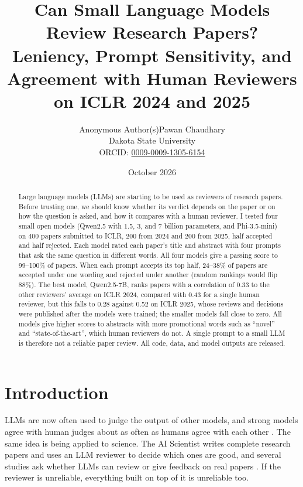 \documentclass[11pt]{article}
\title{\textbf{Can Small Language Models Review Research Papers?}\\[0.3em]
\large Leniency, Prompt Sensitivity, and Agreement with Human Reviewers on ICLR 2024 and 2025}
\author{\ifanonymous Anonymous Author(s)\else Pawan Chaudhary\\ \small Dakota State University\\ \small ORCID: \href{https://orcid.org/0009-0009-1305-6154}{0009-0009-1305-6154}\fi}
\date{October 2026}
\begin{document}
\maketitle

\begin{abstract}
\noindent
Large language models (LLMs) are starting to be used as reviewers of research papers. Before trusting one, we should know whether its verdict depends on the paper or on how the question is asked, and how it compares with a human reviewer. I tested four small open models (Qwen2.5 with 1.5, 3, and 7 billion parameters, and Phi-3.5-mini) on 400 papers submitted to ICLR, 200 from 2024 and 200 from 2025, half accepted and half rejected. Each model rated each paper's title and abstract with four prompts that ask the same question in different words. All four models give a passing score to 99--100\% of papers. When each prompt accepts its top half, 24--38\% of papers are accepted under one wording and rejected under another (random rankings would flip 88\%). The best model, Qwen2.5-7B, ranks papers with a correlation of 0.33 to the other reviewers' average on ICLR 2024, compared with 0.43 for a single human reviewer, but this falls to 0.28 against 0.52 on ICLR 2025, whose reviews and decisions were published after the models were trained; the smaller models fall close to zero. All models give higher scores to abstracts with more promotional words such as ``novel'' and ``state-of-the-art'', which human reviewers do not. A single prompt to a small LLM is therefore not a reliable paper review. All code, data, and model outputs are released.
\end{abstract}

\section{Introduction}

LLMs are now often used to judge the output of other models, and strong models agree with human judges about as often as humans agree with each other \citep{zheng2023judging}. The same idea is being applied to science. The AI Scientist \citep{lu2024aiscientist} writes complete research papers and uses an LLM reviewer to decide which ones are good, and several studies ask whether LLMs can review or give feedback on real papers \citep{liu2023reviewergpt, liang2023feedback, zhou2024reliable}. If the reviewer is unreliable, everything built on top of it is unreliable too.
\end{document}
